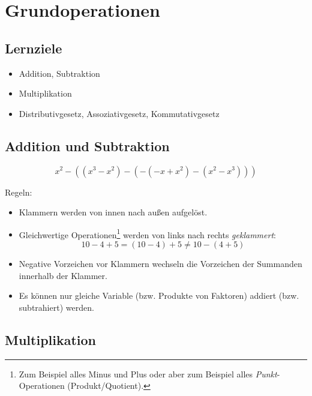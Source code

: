 \newpage
\section{Grundoperationen}

\subsection*{Lernziele}
\begin{itemize}
\item Addition, Subtraktion
\item Multiplikation
\item Distributivgesetz,
  Assoziativgesetz,
  Kommutativgesetz
\end{itemize}
\newpage

\subsection{Addition und Subtraktion}
\begin{beispiel}{}{}
  $$x^2-((x^3-x^2)-(-(-x+x^2)-(x^2-x^3)))$$
\end{beispiel}



Regeln:
\begin{itemize}
\item Klammern werden von innen nach außen aufgelöst.
\item Gleichwertige Operationen\footnote{Zum Beispiel alles Minus und Plus oder aber zum Beispiel alles \textit{Punkt}-Operationen (Produkt/Quotient).} werden von links nach rechts \textit{geklammert}:
  $$10-4+5 = (10-4) + 5 \ne 10-(4+5)$$
\item Negative Vorzeichen vor Klammern wechseln die Vorzeichen der
      Summanden innerhalb der Klammer.
\item Es können nur gleiche Variable (bzw. Produkte von Faktoren)
      addiert (bzw. subtrahiert) werden.
\end{itemize}

\newpage
\subsection{Multiplikation}

